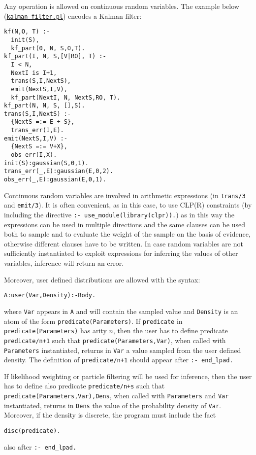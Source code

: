 Any operation is allowed on continuous random variables. The example below
(\href{http://cplint.eu/example/inference/kalman_filter.pl}{\texttt{kalman\_filter.pl}}) encodes a Kalman filter:
\begin{verbatim}
kf(N,O, T) :-
  init(S),
  kf_part(0, N, S,O,T).
kf_part(I, N, S,[V|RO], T) :-
  I < N,
  NextI is I+1,
  trans(S,I,NextS),
  emit(NextS,I,V),
  kf_part(NextI, N, NextS,RO, T).
kf_part(N, N, S, [],S).
trans(S,I,NextS) :-
  {NextS =:= E + S},
  trans_err(I,E).
emit(NextS,I,V) :-
  {NextS =:= V+X},
  obs_err(I,X).
init(S):gaussian(S,0,1).
trans_err(_,E):gaussian(E,0,2).
obs_err(_,E):gaussian(E,0,1).
\end{verbatim}
Continuous random variables are involved
in arithmetic expressions (in \verb|trans/3| and \verb|emit/3|). It
is often convenient, as in this case, to use CLP(R) constraints (by
including the directive \verb|:- use_module(library(clpr)).|) as 
in this way the expressions can be used in multiple directions and 
the same clauses can be used both to sample and to evaluate the weight of the sample on the basis
of evidence,
otherwise different clauses have to be written.
In case random variables are not sufficiently instantiated to 
exploit expressions for inferring the values of other variables, 
inference will return an error.


Moreover, user defined distributions are allowed with the syntax:
\begin{verbatim}
A:user(Var,Density):-Body.
\end{verbatim}
where \verb|Var| appears in \verb|A| and will contain the sampled value and \verb|Density| is an atom of the form \verb|predicate(Parameters)|.
If  \verb|predicate| in \verb|predicate(Parameters)| has arity $n$, then the user has to define predicate \verb|predicate/n+1| such that \verb|predicate(Parameters,Var)|, when
called with \verb|Parameters| instantiated, returns in \verb|Var| a value sampled from the user defined density.
The definition of \verb|predicate/n+1| should appear after \verb|:- end_lpad.|

If likelihood weighting or particle filtering will be used for inference, then the user has to define also predicate \verb|predicate/n+s| such that \verb|predicate(Parameters,Var),Dens|, when
called  with \verb|Parameters| and \verb|Var| instantiated, returns in \verb|Dens| the value of the probability density of \verb|Var|.
Moreover, if the density is discrete, the program must include the fact
\begin{verbatim}
disc(predicate).
\end{verbatim}
also  after \verb|:- end_lpad.|

